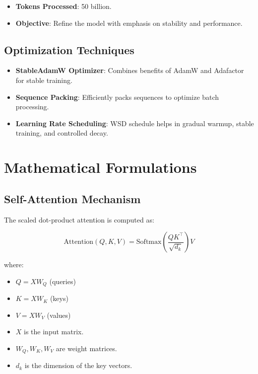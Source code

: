 \documentclass{article}
\begin{document}
\begin{itemize}  
    \item \textbf{Tokens Processed}: 50 billion.  
    \item \textbf{Objective}: Refine the model with emphasis on stability and performance.  
\end{itemize}  
  
\subsection{Optimization Techniques}  
  
\begin{itemize}  
    \item \textbf{StableAdamW Optimizer}: Combines benefits of AdamW and Adafactor for stable training.  
    \item \textbf{Sequence Packing}: Efficiently packs sequences to optimize batch processing.  
    \item \textbf{Learning Rate Scheduling}: WSD schedule helps in gradual warmup, stable training, and controlled decay.  
\end{itemize}  
  
\section{Mathematical Formulations}  
  
\subsection{Self-Attention Mechanism}  
  
The scaled dot-product attention is computed as:  
  
\[  
\text{Attention}(Q, K, V) = \text{Softmax}\left( \frac{Q K^\top}{\sqrt{d_k}} \right) V  
\]  
  
where:  
  
\begin{itemize}  
    \item \( Q = X W_Q \) (queries)  
    \item \( K = X W_K \) (keys)  
    \item \( V = X W_V \) (values)  
    \item \( X \) is the input matrix.  
    \item \( W_Q, W_K, W_V \) are weight matrices.  
    \item \( d_k \) is the dimension of the key vectors.  
\end{itemize}  
  
\end{document}
